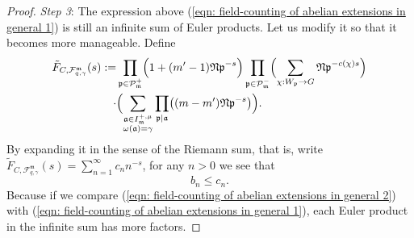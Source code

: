 \documentclass{amsart}
\numberwithin{equation}{section}
\theoremstyle{plain}
\theoremstyle{definition}
\theoremstyle{remark}
\begin{document}
\begin{proof}
	\emph{Step 3}:
	The expression above (\ref{eqn: field-counting of abelian extensions in general 1}) is still an infinite sum of Euler products.
	Let us modify it so that it becomes more manageable.
	Define
	\begin{equation}\label{eqn: field-counting of abelian extensions in general 2}
		\begin{aligned}
			\tilde{F}_{C,\mathcal{F}_{q,\gamma}^{\mathfrak{m}}}(s):=
			&
			\prod_{\mathfrak{p}\in\mathcal{P}_{\mathfrak{m}}^+}
			\Bigl(
			1+(m'-1)\mathfrak{Np}^{-s}
			\Bigr)
			\prod_{\mathfrak{p}\in\mathcal{P}_{\mathfrak{m}}^-}
			\Bigl(
			\sum_{\chi:W_{\mathfrak{p}}\to G}\mathfrak{Np}^{-c(\chi)s}
			\Bigr)
			\\
			\cdot&
			\Bigl(
			\sum_{
				\substack{
					\mathfrak{a}\in I^{+,\mu}_{\mathfrak{m}}\\
					\omega(\mathfrak{a})=\gamma
				}
			}
			\prod_{\mathfrak{p}\mid\mathfrak{a}}\bigl(
			(m-m')\mathfrak{Np}^{-s}			
			\bigr)
			\Bigr).
		\end{aligned}
	\end{equation}
	By expanding it in the sense of the Riemann sum, that is, write $\tilde{F}_{C,\mathcal{F}_{q,\gamma}^{\mathfrak{m}}}(s)=\sum_{n=1}^\infty c_nn^{-s}$, for any $n>0$ we see that
	\begin{equation*}
		b_n\leq c_n.
	\end{equation*}
	Because if we compare (\ref{eqn: field-counting of abelian extensions in general 2}) with (\ref{eqn: field-counting of abelian extensions in general 1}), each Euler product in the infinite sum has more factors.
	

\end{proof}
\end{document}
